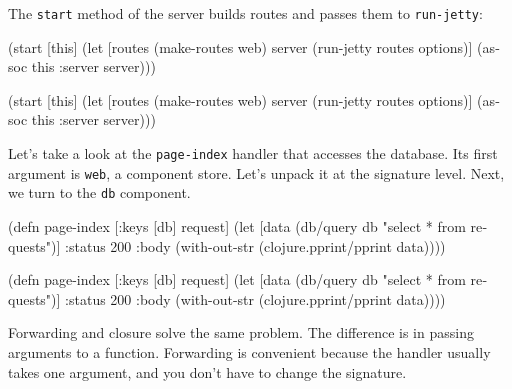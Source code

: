 \fi

\noindent
The \verb|start| method of the server builds routes and passes them to \verb|run-jetty|:

\ifnarrow

\begin{english}
  \begin{clojure}
(start [this]
  (let [routes (make-routes web)
        server (run-jetty
                 routes options)]
    (assoc this :server server)))
  \end{clojure}
\end{english}

\else

\begin{english}
  \begin{clojure}
(start [this]
  (let [routes (make-routes web)
        server (run-jetty routes options)]
    (assoc this :server server)))
  \end{clojure}
\end{english}

\fi

Let's take a look at the \verb|page-index| handler that accesses the database. Its first argument is \verb|web|, a component store. Let's unpack it at the signature level. Next, we turn to the \verb|db| component.

\ifnarrow

\begin{english}
  \begin{clojure}
(defn page-index
  [{:keys [db]} request]
  (let [data (db/query db
               "select * from requests")]
    {:status 200
     :body (with-out-str
             (clojure.pprint/pprint
               data))}))
  \end{clojure}
\end{english}

\else

\begin{english}
  \begin{clojure}
(defn page-index
  [{:keys [db]} request]
  (let [data (db/query db "select * from requests")]
    {:status 200
     :body (with-out-str
             (clojure.pprint/pprint data))}))
  \end{clojure}
\end{english}

\fi

Forwarding and closure solve the same problem. The difference is in passing arguments to a function. Forwarding is convenient because the handler usually takes one argument, and you don't have to change the signature.

